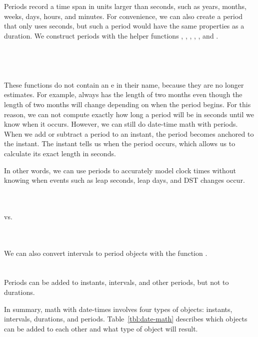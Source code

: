 \documentclass[article]{jss}
\begin{document}
Periods record a time span in units larger than seconds, such as years, months, weeks, days, hours, and minutes. For convenience, we can also create a period that only uses seconds, but such a period would have the same properties as a duration. We construct periods with the helper functions , , , , , and  .\\

\\
\\

\\
\\

These functions do not contain an e in their name, because they are no longer estimates. For example,  always has the length of two months even though the length of two months will change depending on when the period begins. For this reason, we can not compute exactly how long a period will be in seconds until we know when it occurs. However, we can still do date-time math with periods. When we add or subtract a period to an instant, the period becomes anchored to the instant. The instant tells us when the period occurs, which allows us to calculate its exact length in seconds. 

In other words, we can use periods to accurately model clock times without knowing when events such as leap seconds, leap days, and DST changes occur.

\\
\\

vs.

\\
\\

We can also convert intervals to period objects with the function .\\

\\
\\

Periods can be added to instants, intervals, and other periods, but not to durations.


In summary, math with date-times involves four types of objects: instants, intervals, durations, and periods. Table~\ref{tbl:date-math} describes which objects can be added to each other and what type of object will result.
\end{document}
